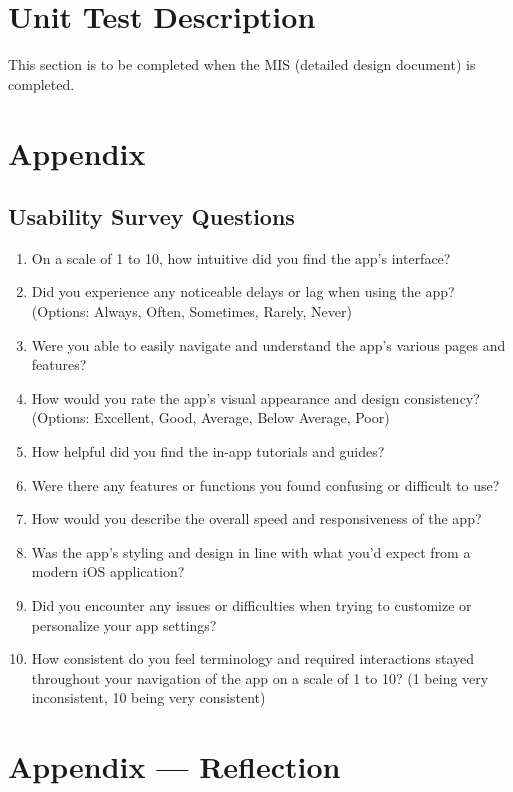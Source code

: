 \documentclass[12pt, titlepage]{article}
\begin{document}
\restoregeometry

\section{Unit Test Description}

This section is to be completed when the MIS (detailed design document) is completed.

\section{Appendix}

\subsection{Usability Survey Questions}

\begin{enumerate}
    \item On a scale of 1 to 10, how intuitive did you find the app's interface?
    \item Did you experience any noticeable delays or lag when using the app? (Options: Always, Often, Sometimes, Rarely, Never)
    \item Were you able to easily navigate and understand the app's various pages and features?
    \item How would you rate the app's visual appearance and design consistency? (Options: Excellent, Good, Average, Below Average, Poor)
    \item How helpful did you find the in-app tutorials and guides?
    \item Were there any features or functions you found confusing or difficult to use?
    \item How would you describe the overall speed and responsiveness of the app?
    \item Was the app's styling and design in line with what you'd expect from a modern iOS application?
    \item Did you encounter any issues or difficulties when trying to customize or personalize your app settings?
    \item How consistent do you feel terminology and required interactions stayed throughout your navigation of the app on a scale of 1 to 10? (1 being very inconsistent, 10 being very consistent)
\end{enumerate}

\newpage{}
\section*{Appendix --- Reflection}
\end{document}
